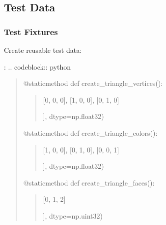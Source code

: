 \documentclass[a4paper,10pt,english,openany,oneside]{sphinxmanual}
\begin{document}
\subsection{Test Data}
\label{\detokenize{testing:test-data}}

\subsubsection{Test Fixtures}
\label{\detokenize{testing:test-fixtures}}
\sphinxAtStartPar
Create reusable test data:

\sphinxAtStartPar
{}:
.. code\sphinxhyphen{}block:: python
\begin{quote}
\begin{description}
\sphinxAtStartPar
@staticmethod
def create\_triangle\_vertices():
\begin{quote}
\begin{description}
\sphinxlineitem{return np.array({[}}
\sphinxAtStartPar
{[}0, 0, 0{]},
{[}1, 0, 0{]},
{[}0, 1, 0{]}

\end{description}

\sphinxAtStartPar
{]}, dtype=np.float32)
\end{quote}

\sphinxAtStartPar
@staticmethod
def create\_triangle\_colors():
\begin{quote}
\begin{description}
\sphinxlineitem{return np.array({[}}
\sphinxAtStartPar
{[}1, 0, 0{]},
{[}0, 1, 0{]},
{[}0, 0, 1{]}

\end{description}

\sphinxAtStartPar
{]}, dtype=np.float32)
\end{quote}

\sphinxAtStartPar
@staticmethod
def create\_triangle\_faces():
\begin{quote}
\begin{description}
\sphinxlineitem{return np.array({[}}
\sphinxAtStartPar
{[}0, 1, 2{]}

\end{description}

\sphinxAtStartPar
{]}, dtype=np.uint32)
\end{quote}

\end{description}
\end{quote}
\end{document}
